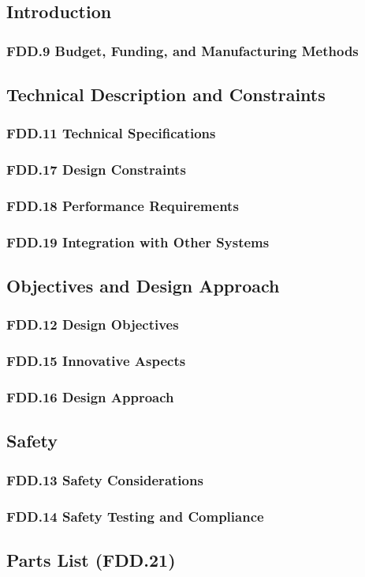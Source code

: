 \subsection{Introduction}
\subsubsection{FDD.9 Budget, Funding, and Manufacturing Methods}
 
\subsection{Technical Description and Constraints}
\subsubsection{FDD.11 Technical Specifications}
 
\subsubsection{FDD.17 Design Constraints}
 
\subsubsection{FDD.18 Performance Requirements}
 
\subsubsection{FDD.19 Integration with Other Systems}
 
\subsection{Objectives and Design Approach}
\subsubsection{FDD.12 Design Objectives}
 
\subsubsection{FDD.15 Innovative Aspects}
 
\subsubsection{FDD.16 Design Approach}
 
\subsection{Safety}
\subsubsection{FDD.13 Safety Considerations}
 
\subsubsection{FDD.14 Safety Testing and Compliance}
 
\subsection{Parts List (FDD.21)}

\newpage